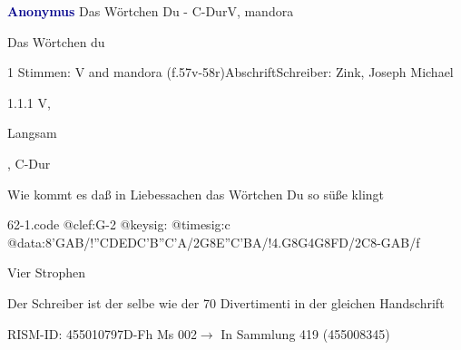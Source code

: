 \documentclass[twocolumn]{book}
\begin{document}
\par \vspace{7pt} \textcolor{darkblue}{\textbf{Anonymus  }}\hfillplus{\textbf{[62]}}\newline Das Wörtchen Du - C-Dur\newline V, mandora
\par \begin{itshape}[heading, f.57v:] Das Wörtchen du\end{itshape} 
\par \textcolor{darkblue}{}  1 Stimmen: V and mandora  (f.57v-58r)\newline Abschrift\newline Schreiber: Zink, Joseph Michael
\par 1.1.1  V, \begin{itshape}Langsam\end{itshape}, C-Dur\newline \begin{footnotesize} Wie kommt es daß in Liebessachen das Wörtchen Du so süße klingt \end{footnotesize}  
\begin{filecontents*}{62-1.code}
@clef:G-2
@keysig:
@timesig:c
@data:8'GAB/!{''CD}{ED}{C'B}{''C'A}/2G8E''C'BA/!4.G8G4G8FD/2C8-GAB/f
\end{filecontents*}
\newline
%
\par Vier Strophen
\par Der Schreiber ist der selbe wie der 70 Divertimenti in der gleichen Handschrift
\par RISM-ID: 455010797\newline D-Fh  Ms 002\newline $\rightarrow$ In Sammlung 419 (455008345)
      
\end{document}
